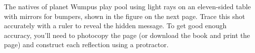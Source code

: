 The natives of planet Wumpus play pool using light rays
on an eleven-sided table with mirrors for bumpers, shown in the figure on the next
page. Trace
this shot accurately with a ruler to reveal the hidden
message. To get good enough accuracy, you'll need to
photocopy the page (or download the book and print the page)
and construct each reflection using a protractor.
